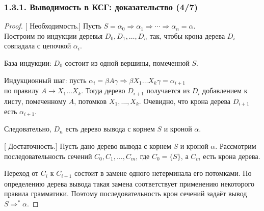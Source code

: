\documentclass[mathserif,12pt,aspectratio=169]{beamer}
\def\proofsection#1{\par{\color{brown}\sffamily\small  [\;}{\sffamily\small\color{brown} #1}{\sffamily\small\color{brown}\;]}\;}
\begin{document}
\begin{frame}
\frametitle{1.3.1. Выводимость в КСГ: доказательство (4/7)}

\begin{proof}
\proofsection{Необходимость.}
Пусть
$
S = \alpha_0 \Rightarrow \alpha_1 \Rightarrow \cdots \Rightarrow \alpha_n = \alpha.
$
\\
Построим по индукции деревья $D_0, D_1, \dots, D_n$ так,
чтобы крона дерева $D_i$ совпадала с цепочкой $\alpha_i$.

База индукции: $D_0$ состоит из одной вершины, помеченной $S$.

Индукционный шаг: пусть
$
\alpha_i = \beta A \gamma \Rightarrow \beta X_1 \dots X_k \gamma = \alpha_{i+1}
$
\\
по правилу $A \to X_1 \dots X_k$.
Тогда дерево $D_{i+1}$ получается из $D_i$ добавлением к листу,
помеченному $A$, потомков $X_1, \dots, X_k$.
Очевидно, что крона дерева $D_{i+1}$ есть $\alpha_{i+1}$.

Следовательно, $D_n$ есть дерево вывода с корнем $S$ и кроной $\alpha$.

\proofsection{Достаточность.}
Пусть дано дерево вывода с корнем $S$ и кроной $\alpha$.
Рассмотрим последовательность сечений $C_0, C_1, \dots, C_m$,
где $C_0=\{S\}$, а $C_m$ есть крона дерева.

Переход от $C_i$ к $C_{i+1}$ состоит в замене одного нетерминала
его потомками.
По определению дерева вывода такая замена соответствует применению
некоторого правила грамматики.
Поэтому последовательность крон сечений задаёт вывод
$
S \Rightarrow^* \alpha.
$
\end{proof}

\end{frame}
\end{document}
